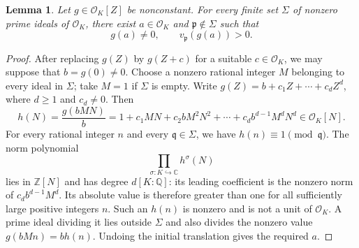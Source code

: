 \documentclass[11pt,a4paper]{article}
\newtheorem{lemma}[theorem]{Lemma}
\theoremstyle{definition}
\begin{document}
\begin{lemma}\label{lb:prime-divisors}
Let $g\in\mathcal O_K[Z]$ be nonconstant. For every finite set
$\Sigma$ of nonzero prime ideals of $\mathcal O_K$, there exist
$a\in\mathcal O_K$ and $\mathfrak p\notin\Sigma$ such that
\[
                  g(a)\ne0,
          \qquad v_{\mathfrak p}(g(a))>0.
\]
\end{lemma}
\begin{proof}
After replacing $g(Z)$ by $g(Z+c)$ for a suitable $c\in\mathcal O_K$,
we may suppose that $b=g(0)\ne0$. Choose a nonzero rational integer
$M$ belonging to every ideal in $\Sigma$; take $M=1$ if $\Sigma$ is
empty. Write $g(Z)=b+c_1Z+\cdots+c_dZ^d$, where $d\ge1$ and $c_d\ne0$.
Then
\[
 h(N)=\frac{g(bMN)}b
      =1+c_1MN+c_2bM^2N^2+\cdots+c_db^{d-1}M^dN^d
      \in\mathcal O_K[N].
\]
For every rational integer $n$ and every $\mathfrak q\in\Sigma$,
we have $h(n)\equiv1\pmod{\mathfrak q}$. The norm polynomial
\[
                    \prod_{\sigma:K\hookrightarrow\mathbb C}h^\sigma(N)
\]
lies in $\mathbb Z[N]$ and has degree $d[K:\mathbb Q]$: its
leading coefficient is the nonzero norm of $c_db^{d-1}M^d$.
Its absolute value is therefore greater than one for all sufficiently
large positive integers $n$. Such an $h(n)$ is nonzero and is not a
unit of $\mathcal O_K$. A prime ideal dividing it lies outside
$\Sigma$ and also divides the nonzero value $g(bMn)=b h(n)$.
Undoing the initial translation gives the required $a$.
\end{proof}
\end{document}
